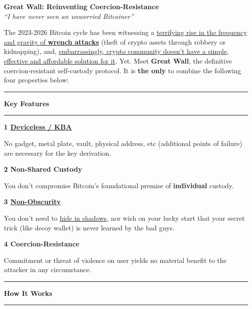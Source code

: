 \documentclass[8pt]{article}
\newcommand{\obsegg}{https://www.linkedin.com/posts/lugano-plan-b_luganoplanb-bitcoin-activity-7167881837728493568-LEZk/}
\newcommand{\theproblem}{https://x.com/search?q=jameson\%20lopp\%20wrench\%20attack&src=typed_query&f=live}
\newcommand{\nocurrentsolution}{https://www.youtube.com/watch?v=MsfR6ZIkzPs&t=2734s}
\newcommand{\kba}{https://en.wikipedia.org/wiki/Knowledge-based_authentication}
\newcommand{\kprinciple}{https://en.wikipedia.org/wiki/Kerckhoffs's_principle}
\newcommand{\feature}[2]{
    \noindent\textbf{\large #1}\par
    \vspace{2pt}
    #2
    \vspace{11pt}
}
\begin{document}
\pagestyle{empty}  %
\begin{center}
    \vspace*{-1cm}
    {\huge\bfseries\color{accent} Great Wall: Reinventing Coercion-Resistance}\\[1ex]
    {\large\textit{``I have never seen an unworried Bitcoiner''}}
    \vspace{0.2cm}
\end{center}

\noindent
The 2023-2026 Bitcoin cycle has been witnessing a \href{\theproblem}{terrifying rise in the frequency and gravity of \textbf{wrench attacks}} (theft of crypto assets through robbery or kidnapping), and, \href{\nocurrentsolution}{embarrassingly, crypto community doesn't have a simple, effective and affordable solution for it}. Yet. Meet \textbf{Great Wall}, the definitive coercion-resistant self-custody protocol. It is \textbf{the only} to combine the following four properties below: 

\vspace{0.2cm}

{\color{accent}\hrule}
\vspace{0.2cm}
{\Large\textbf{Key Features}}
\vspace{0.2cm}
{\color{accent}\hrule}
\vspace{0.2cm}

\begin{multicols}{2}
    \feature{1 \href{\kba}{Deviceless / KBA}}{
        No gadget, metal plate, vault, physical address, etc (additional points of failure) are necessary for the key derivation. 
    }

    \feature{2 Non-Shared Custody}{
        You don't compromise Bitcoin's foundational premise of \textbf{individual} custody.
    }

    \feature{3 \href{\kprinciple}{Non-Obscurity}}{
        You don't need to \href{\obsegg}{hide in shadows}, nor wish on your lucky start that your secret trick (like decoy wallet) is never learned by the bad guys.
    }

    \feature{4 Coercion-Resistance}{
        Commitment or threat of violence on user yields no material benefit to the attacker in any circumstance.
    }
\end{multicols}


{\color{accent}\hrule}
\vspace{0.2cm}
{\Large\textbf{How It Works}}
\vspace{0.2cm}
{\color{accent}\hrule}
\vspace{0.3cm}
\end{document}
